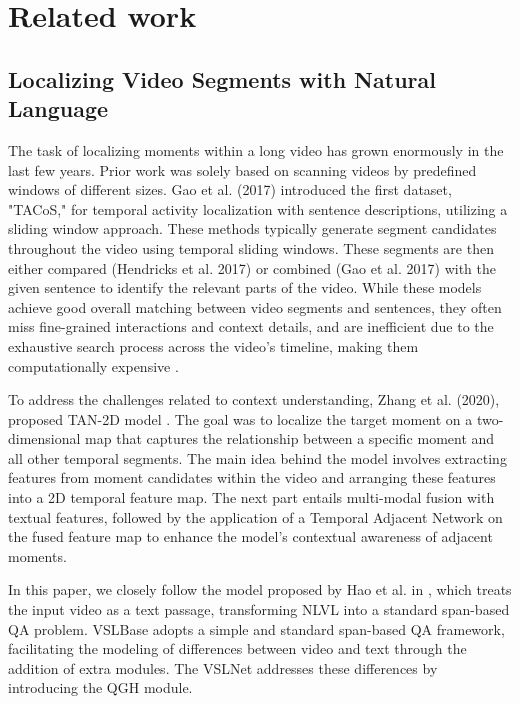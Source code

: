 \documentclass[10pt,twocolumn,letterpaper]{article}
\begin{document}
\section{Related work}

\subsection{Localizing Video Segments with Natural Language}

The task of localizing moments within a long video has grown enormously in the last few years. Prior work was solely based on scanning videos by predefined windows of different sizes. Gao et al. (2017) introduced the first dataset, "TACoS," for temporal activity localization with sentence descriptions, utilizing a sliding window approach. These methods typically generate segment candidates throughout the video using temporal sliding windows. These segments are then either compared (Hendricks et al. 2017) or combined (Gao et al. 2017) with the given sentence to identify the relevant parts of the video. While these models achieve good overall matching between video segments and sentences, they often miss fine-grained interactions and context details, and are inefficient due to the exhaustive search process across the video's timeline, making them computationally expensive \cite{b4}.


To address the challenges related to context understanding, Zhang et al. (2020), proposed TAN-2D model \cite{2dTan}. The goal was to localize the target moment on a two-dimensional map that captures the relationship between a specific moment and all other temporal segments. The main idea behind the model involves extracting features from moment candidates within the video and arranging these features into a 2D temporal feature map. The next part entails multi-modal fusion with textual features, followed by the application of a Temporal Adjacent Network on the fused feature map to enhance the model's contextual awareness of adjacent moments.

In this paper, we closely follow the model proposed by Hao et al. in \cite{b3}, which treats the input video as a text passage, transforming NLVL into a standard span-based QA problem. VSLBase adopts a simple and standard span-based QA framework, facilitating the modeling of differences between video and text through the addition of extra modules. The VSLNet addresses these differences by introducing the QGH module.
\end{document}
